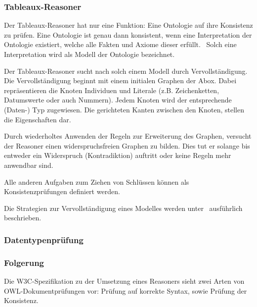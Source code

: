 \subsubsection{Tableaux-Reasoner}
\label{ssubsection:inferenz_pellet_tableaux}
Der Tableaux-Reasoner hat nur eine Funktion: Eine Ontologie auf ihre Konsistenz zu prüfen. Eine Ontologie ist genau dann konsistent, wenn eine Interpretation der Ontologie existiert, welche alle Fakten und Axiome dieser erfüllt.~\cite{w3owlsemantics} Solch eine Interpretation wird als Modell der Ontologie bezeichnet. 

Der Tableaux-Reasoner sucht nach solch einem Modell durch Vervollständigung. Die Vervollständigung beginnt mit einem initialen Graphen der Abox. Dabei repräsentieren die Knoten Individuen und Literale (z.B. Zeichenketten, Datumswerte oder auch Nummern). Jedem Knoten wird der entsprechende (Daten-) Typ zugewiesen. Die gerichteten Kanten zwischen den Knoten, stellen die Eigenschaften dar. 

Durch wiederholtes Anwenden der Regeln zur Erweiterung des Graphen, versucht der Reasoner einen widerspruchsfreien Graphen zu bilden. Dies tut er solange bis entweder ein Widerspruch (Kontradiktion) auftritt oder keine Regeln mehr anwendbar sind.

Alle anderen Aufgaben zum Ziehen von Schlüssen können als Konsistenzprüfungen definiert werden.

Die Strategien zur Vervollständigung eines Modelles werden unter~\cite[Seiten 7 bis 9]{sirin:pellet05} ausführlich beschrieben.

\subsubsection{Datentypenprüfung}
\label{ssubsection:inferenz_pellet_datatypes}




\subsubsection{Folgerung}
\label{subsubsection:folgerung}
Die W3C-Spezifikation zu der Umsetzung eines Reasoners sieht zwei Arten von OWL-Dokumentprüfungen vor: Prüfung auf korrekte Syntax, sowie Prüfung der Konsistenz.

